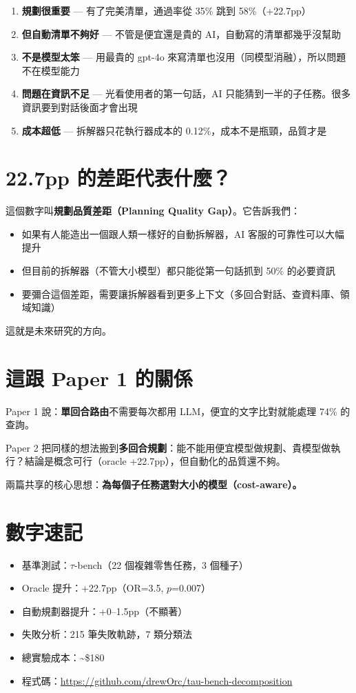 \documentclass[11pt,a4paper]{article}
\begin{document}
\begin{enumerate}
\item \textbf{規劃很重要} — 有了完美清單，通過率從 35\% 跳到 58\%（+22.7pp）
\item \textbf{但自動清單不夠好} — 不管是便宜還是貴的 AI，自動寫的清單都幾乎沒幫助
\item \textbf{不是模型太笨} — 用最貴的 gpt-4o 來寫清單也沒用（同模型消融），所以問題不在模型能力
\item \textbf{問題在資訊不足} — 光看使用者的第一句話，AI 只能猜到一半的子任務。很多資訊要到對話後面才會出現
\item \textbf{成本超低} — 拆解器只花執行器成本的 0.12\%，成本不是瓶頸，品質才是
\end{enumerate}

\section*{22.7pp 的差距代表什麼？}

這個數字叫\textbf{規劃品質差距（Planning Quality Gap）}。它告訴我們：

\begin{itemize}
\item 如果有人能造出一個跟人類一樣好的自動拆解器，AI 客服的可靠性可以大幅提升
\item 但目前的拆解器（不管大小模型）都只能從第一句話抓到 50\% 的必要資訊
\item 要彌合這個差距，需要讓拆解器看到更多上下文（多回合對話、查資料庫、領域知識）
\end{itemize}

這就是未來研究的方向。

\section*{這跟 Paper 1 的關係}

Paper 1 說：\textbf{單回合路由}不需要每次都用 LLM，便宜的文字比對就能處理 74\% 的查詢。

Paper 2 把同樣的想法搬到\textbf{多回合規劃}：能不能用便宜模型做規劃、貴模型做執行？結論是概念可行（oracle +22.7pp），但自動化的品質還不夠。

兩篇共享的核心思想：\textbf{為每個子任務選對大小的模型（cost-aware）。}

\section*{數字速記}

\begin{itemize}
\item 基準測試：$\tau$-bench（22 個複雜零售任務，3 個種子）
\item Oracle 提升：+22.7pp（OR=3.5, $p$=0.007）
\item 自動規劃器提升：+0--1.5pp（不顯著）
\item 失敗分析：215 筆失敗軌跡，7 類分類法
\item 總實驗成本：\textasciitilde\$180
\item 程式碼：\url{https://github.com/drewOrc/tau-bench-decomposition}
\end{itemize}
\end{document}
